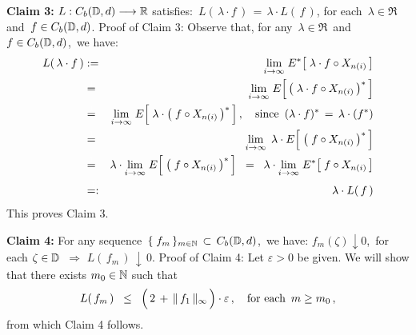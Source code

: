 \vskip 0.5cm
\noindent
\textbf{Claim 3:}\;\;
$L : C_{b}(\mathbb{D},d) \longrightarrow \mathbb{R}$ satisfies:\,
$L(\,\lambda\cdot f\,) \,=\, \lambda \cdot L(\,f\,)$,\;
for each \,$\lambda \in \Re$\, and \,$f \in C_{b}(\mathbb{D},d)$.
\vskip 0.2cm
\noindent
Proof of Claim 3:\;\;
Observe that, for any \,$\lambda \in \Re$\, and \,$f \in C_{b}(\mathbb{D},d)$,\, we have:
\begin{eqnarray*}
L(\,\lambda \cdot f\,)
&:=&
	\underset{i\rightarrow\infty}{\lim}\;
	E^{*}\!\left[\; \lambda \cdot f \circ X_{n(i)} \,\right]
\\
& \overset{{\color{white}1}}{=} &
	\underset{i\rightarrow\infty}{\lim}\;
	E\!\left[\,\left(\; \lambda \cdot f \circ X_{n(i)} \,\right)^{*}\,\right]
\\
& \overset{{\color{white}1}}{=} &
	\underset{i\rightarrow\infty}{\lim}\;
	E\!\left[\; \lambda \cdot \left(\; f \circ X_{n(i)}\,\right)^{*} \,\right],
	\quad
	\textnormal{since \,$(\lambda \cdot f)^{*} \,=\, \lambda \cdot (f^{*})$}
\\
& \overset{{\color{white}1}}{=} &
	\underset{i\rightarrow\infty}{\lim}\;\,
	\lambda \cdot E\!\left[\;\left(\; f \circ X_{n(i)}\,\right)^{*} \,\right]
\\
& \overset{{\color{white}1}}{=} &
	\lambda \cdot
	\underset{i\rightarrow\infty}{\lim}\;
	E\!\left[\;\left(\; f \circ X_{n(i)}\,\right)^{*} \,\right]
\;\; = \;\;
	\lambda \cdot
	\underset{i\rightarrow\infty}{\lim}\;
	E^{*}\!\left[\; f \circ X_{n(i)} \,\right]
\\
& \overset{{\color{white}1}}{=:} &
	\lambda \cdot L(\,f\,)
\end{eqnarray*}
This proves Claim 3.

\vskip 0.5cm
\noindent
\textbf{Claim 4:}\;\;
For any sequence \,$\{\;f_{m}\,\}_{m\in\mathbb{N}} \,\subset\, C_{b}(\mathbb{D},d)$,\,
we have:\;
$f_{m}(\zeta) \downarrow 0$,\, for each $\zeta \in \mathbb{D}$
\;\,$\Longrightarrow$\;
$L(\,f_{m}\,) \,\downarrow\, 0$.
\vskip 0.2cm
\noindent
Proof of Claim 4:\;\;
Let $\varepsilon > 0$ be given. We will show that there exists $m_{0} \in \mathbb{N}$ such that
\begin{equation*}
L(\,f_{m}\,)
\;\; \leq \;\;
	\left(\,2 \, \overset{{\color{white}.}}{+} \, \Vert\,f_{1}\,\Vert_{\infty} \,\right) \cdot \varepsilon\,,
\quad
\textnormal{for each \,$m \geq m_{0}$}\,,
\end{equation*}
from which Claim 4 follows.

